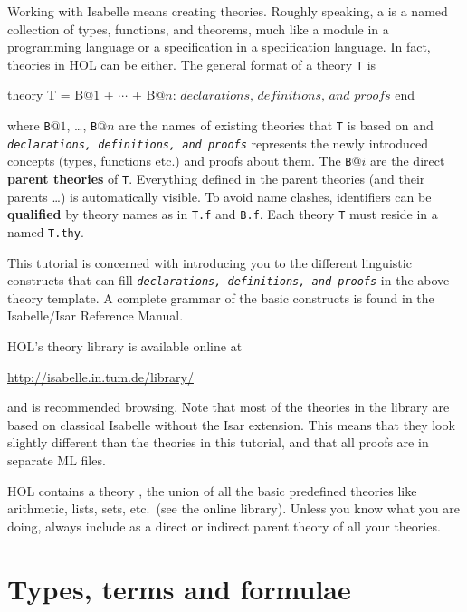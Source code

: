 Working with Isabelle means creating theories. Roughly speaking, a
 is a named collection of types, functions, and theorems,
much like a module in a programming language or a specification in a
specification language. In fact, theories in HOL can be either. The general
format of a theory \texttt{T} is
\begin{ttbox}
theory T = B\(@1\) + \(\cdots\) + B\(@n\):
\(\textit{declarations, definitions, and proofs}\)
end
\end{ttbox}
where \texttt{B}$@1$, \dots, \texttt{B}$@n$ are the names of existing
theories that \texttt{T} is based on and \texttt{\textit{declarations,
    definitions, and proofs}} represents the newly introduced concepts
(types, functions etc.) and proofs about them. The \texttt{B}$@i$ are the
direct \textbf{parent theories} of \texttt{T}.
Everything defined in the parent theories (and their parents \dots) is
automatically visible. To avoid name clashes, identifiers can be
\textbf{qualified} by theory names as in \texttt{T.f} and
\texttt{B.f}. Each theory \texttt{T} must
reside in a  named \texttt{T.thy}.

This tutorial is concerned with introducing you to the different linguistic
constructs that can fill \textit{\texttt{declarations, definitions, and
    proofs}} in the above theory template.  A complete grammar of the basic
constructs is found in the Isabelle/Isar Reference Manual.

HOL's theory library is available online at
\begin{center}\small
    \url{http://isabelle.in.tum.de/library/}
\end{center}
and is recommended browsing. Note that most of the theories in the library
are based on classical Isabelle without the Isar extension. This means that
they look slightly different than the theories in this tutorial, and that all
proofs are in separate ML files.

\begin{warn}
  HOL contains a theory , the union of all the basic
  predefined theories like arithmetic, lists, sets, etc.\ (see the online
  library).  Unless you know what you are doing, always include 
  as a direct or indirect parent theory of all your theories.
\end{warn}


\section{Types, terms and formulae}
\label{sec:TypesTermsForms}

